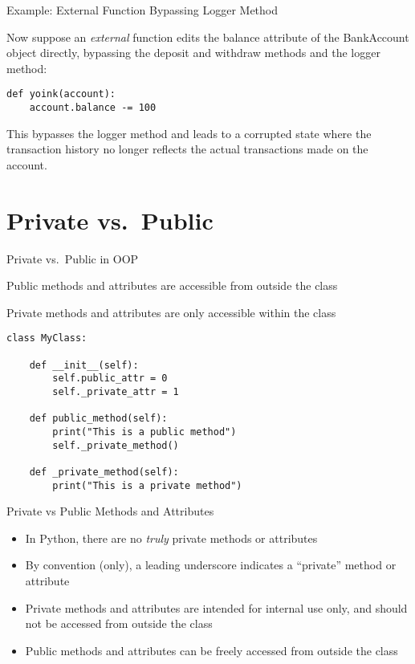 \documentclass[handout]{beamer}
\begin{document}
\begin{frame}[fragile]{Example: External Function Bypassing Logger Method}
    
    Now suppose an \textit{external} function edits the balance attribute of the BankAccount object directly, bypassing the deposit and withdraw methods and the logger method:
    
    \begin{lstlisting}[style=python]
def yoink(account):
    account.balance -= 100
    \end{lstlisting}
    
    This bypasses the logger method and leads to a corrupted state where the transaction history no longer reflects the actual transactions made on the account.
    
\end{frame}


\section{Private vs.\ Public}

\begin{frame}[fragile]{Private vs.\ Public in OOP}
    
    Public methods and attributes are accessible from outside the class
    
    Private methods and attributes are only accessible within the class
    
    \begin{lstlisting}[style=python]
class MyClass:
    
    def __init__(self):
        self.public_attr = 0
        self._private_attr = 1
    
    def public_method(self):
        print("This is a public method")
        self._private_method()
    
    def _private_method(self):
        print("This is a private method")

    \end{lstlisting}
    
\end{frame}


\begin{frame}[fragile]{Private vs Public Methods and Attributes}
  \begin{itemize}
    \item In Python, there are no \textit{truly} private methods or attributes
    \item By convention (only), a leading underscore indicates a ``private'' method or attribute
    \item Private methods and attributes are intended for internal use only, and should not be accessed from outside the class
    \item Public methods and attributes can be freely accessed from outside the class
  \end{itemize}
\end{frame}
\end{document}
